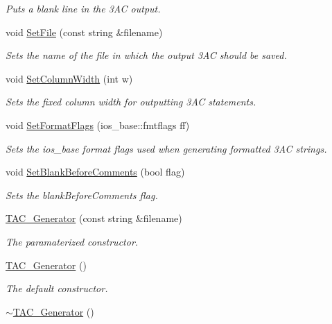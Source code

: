 \begin{DoxyCompactItemize}
\begin{DoxyCompactList}\small\item\em Puts a blank line in the 3\-A\-C output. \end{DoxyCompactList}\item 
void \hyperlink{classTAC__Generator_a1c8e7f2ace8e7e96b4a2a1909ca054fe}{Set\-File} (const string \&filename)
\begin{DoxyCompactList}\small\item\em Sets the name of the file in which the output 3\-A\-C should be saved. \end{DoxyCompactList}\item 
void \hyperlink{classTAC__Generator_a2268378a805c9722cf4693e97b67166e}{Set\-Column\-Width} (int w)
\begin{DoxyCompactList}\small\item\em Sets the fixed column width for outputting 3\-A\-C statements. \end{DoxyCompactList}\item 
void \hyperlink{classTAC__Generator_aacd4a0f0dd9c2cc79da4cf9d9d1e442e}{Set\-Format\-Flags} (ios\-\_\-base\-::fmtflags ff)
\begin{DoxyCompactList}\small\item\em Sets the ios\-\_\-base format flags used when generating formatted 3\-A\-C strings. \end{DoxyCompactList}\item 
void \hyperlink{classTAC__Generator_a6d909e88feeb387d89ee154aeb6466f2}{Set\-Blank\-Before\-Comments} (bool flag)
\begin{DoxyCompactList}\small\item\em Sets the blank\-Before\-Comments flag. \end{DoxyCompactList}\item 
\hyperlink{classTAC__Generator_a0b99317caae367b6e6f2a2ca89be1da1}{T\-A\-C\-\_\-\-Generator} (const string \&filename)
\begin{DoxyCompactList}\small\item\em The paramaterized constructor. \end{DoxyCompactList}\item 
\hyperlink{classTAC__Generator_aa4dfb06c9feb7fa4f95cdc382ab9809c}{T\-A\-C\-\_\-\-Generator} ()
\begin{DoxyCompactList}\small\item\em The default constructor. \end{DoxyCompactList}\item 
\hyperlink{classTAC__Generator_a66d2bfd04edb3098bf3e9f7b24be579f}{$\sim$\-T\-A\-C\-\_\-\-Generator} ()

\end{DoxyCompactItemize}
